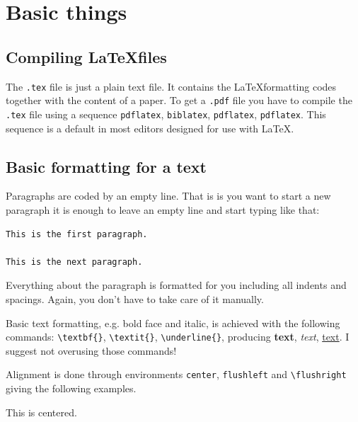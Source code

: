 \documentclass[english, twoside, 12pt, a4paper]{article}
\theoremstyle{definition}
\theoremstyle{plain}
\theoremstyle{remark}
\begin{document}

\clearpage
\section{Basic things}

\subsection{Compiling \LaTeX files}

The \verb+.tex+ file is just a plain text file. It contains the \LaTeX formatting codes together with the content of a paper. To get a \verb+.pdf+ file you have to compile the \verb+.tex+ file using a sequence \verb+pdflatex+, \verb+biblatex+, \verb+pdflatex+, \verb+pdflatex+. This sequence is a default in most editors designed for use with \LaTeX.

\subsection{Basic formatting for a text}

Paragraphs are coded by an empty line. That is is you want to start a new paragraph it is enough to leave an empty line and start typing like that:
\begin{verbatim}
This is the first paragraph.

This is the next paragraph.
\end{verbatim}

Everything about the paragraph is formatted for you including all indents and spacings. Again, you don't have to take care of it manually.

Basic text formatting, e.g. bold face and italic, is achieved with the following commands: \verb+\textbf{}+, \verb+\textit{}+, \verb+\underline{}+, producing \textbf{text}, \textit{text}, \underline{text}. I suggest not overusing those commands!

Alignment is done through environments \verb+center+, \verb+flushleft+ and \verb+\flushright+ giving the following examples.

\begin{center}
  This is centered.
\end{center}
\end{document}
